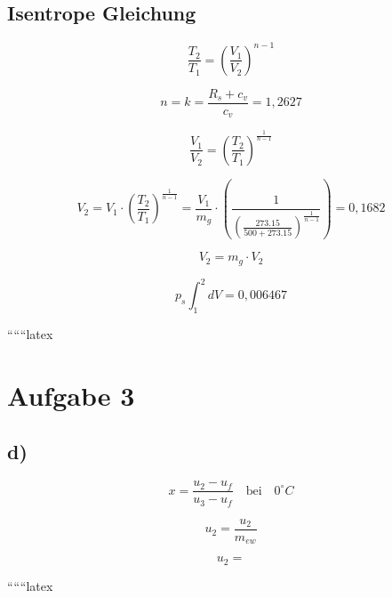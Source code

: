 \subsection*{Isentrope Gleichung}

\begin{equation*}
\frac{T_2}{T_1} = \left( \frac{V_1}{V_2} \right)^{n-1}
\end{equation*}

\begin{equation*}
n = k = \frac{R_s + c_v}{c_v} = 1,2627
\end{equation*}

\begin{equation*}
\frac{V_1}{V_2} = \left( \frac{T_2}{T_1} \right)^{\frac{1}{n-1}}
\end{equation*}

\begin{equation*}
V_2 = V_1 \cdot \left( \frac{T_2}{T_1} \right)^{\frac{1}{n-1}} = \frac{V_1}{m_g} \cdot \left( \frac{1}{\left( \frac{273.15}{500 + 273.15} \right)^{\frac{1}{n-1}}} \right) = 0,1682
\end{equation*}

\begin{equation*}
V_2 = m_g \cdot V_2
\end{equation*}

\begin{equation*}
p_s \int_1^2 dV = 0,006467
\end{equation*}

``````latex


\section*{Aufgabe 3}

\subsection*{d)}
\[
x = \frac{u_2 - u_f}{u_3 - u_f} \quad \text{bei} \quad \boxed{0^\circ C}
\]

\[
u_2 = \frac{u_2}{m_{ew}}
\]

\[
u_2 =
\]

``````latex



